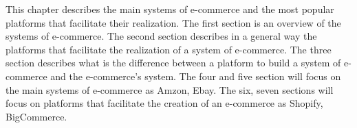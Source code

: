 This chapter describes the main systems of e-commerce and the most popular platforms that facilitate their realization.
The first section is an overview of the systems of e-commerce. The second section describes in a general way the platforms that facilitate the realization of a system of e-commerce. The three section describes what is the difference between a platform to build a system of e-commerce and the e-commerce's system. The four and five section will focus on the main systems of e-commerce as Amzon, Ebay. The six, seven sections will focus on platforms that
facilitate the creation of an e-commerce as Shopify, BigCommerce.